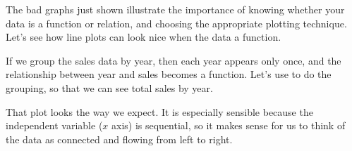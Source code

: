 \documentclass[letterpaper,10pt,english]{jupyterBook}
\begin{document}
\noindent{}

\sphinxAtStartPar
The bad graphs just shown illustrate the importance of knowing whether your data is a function or relation, and choosing the appropriate plotting technique.  Let’s see how line plots can look nice when the data  a function.

\sphinxAtStartPar
{} If we group the sales data by year, then each year appears only once, and the relationship between year and sales becomes a function.  Let’s use  to do the grouping, so that we can see total sales by year.

\begin{sphinxVerbatim}[commandchars=\\\{\}]
    
  \PYG{p}{[}\PYG{p}{]}   
      
  
  
\end{sphinxVerbatim}

\noindent{}

\sphinxAtStartPar
That plot looks the way we expect.  It is especially sensible because the independent variable (\(x\) axis) is sequential, so it makes sense for us to think of the data as connected and flowing from left to right.
\end{document}
